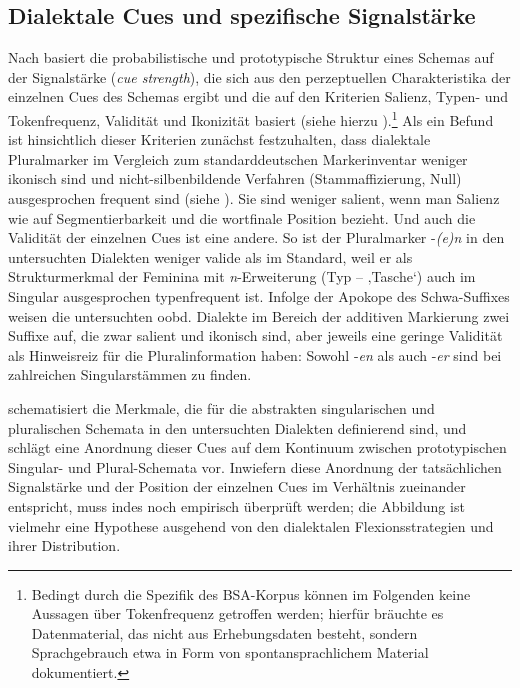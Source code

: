 \subsection{Dialektale Cues und spezifische Signalstärke}
\label{sec:10.3.1}
Nach \citet{Köpcke1988, Köpcke1993} basiert die probabilistische und prototypische Struktur eines Schemas auf der Signalstärke (\textit{cue strength}), die sich aus den perzeptuellen Charakteristika der einzelnen Cues des Schemas ergibt und die auf den Kriterien Salienz, Typen- und Tokenfrequenz, Validität und Ikonizität basiert (siehe hierzu ).\footnote{Bedingt durch die Spezifik des BSA-Korpus können im Folgenden keine Aussagen über Tokenfrequenz getroffen werden; hierfür bräuchte es Datenmaterial, das nicht aus Erhebungsdaten besteht, sondern Sprachgebrauch etwa in Form von spontansprachlichem Material dokumentiert.} Als ein Befund ist hinsichtlich dieser Kriterien zunächst festzuhalten, dass dialektale Pluralmarker im Vergleich zum standarddeutschen Markerinventar weniger ikonisch sind und nicht-silbenbildende Verfahren (Stammaffizierung, Null) ausgesprochen frequent sind (siehe ). Sie sind weniger salient, wenn man Salienz wie \citet[82]{Köpcke1993} auf Segmentierbarkeit und die wortfinale Position bezieht. Und auch die Validität der einzelnen Cues ist eine andere. So ist der Pluralmarker -\textit{(e)n} in den untersuchten Dialekten weniger valide als im Standard, weil er als Strukturmerkmal der Feminina mit \textit{n}{}-Erweiterung (Typ  --  ‚Tasche‘) auch im Singular ausgesprochen typenfrequent ist. Infolge der Apokope des Schwa-Suffixes weisen die untersuchten oobd. Dialekte im Bereich der additiven Markierung zwei Suffixe auf, die zwar salient und ikonisch sind, aber jeweils eine geringe Validität als Hinweisreiz für die Pluralinformation haben: Sowohl -\textit{en} als auch -\textit{er} sind bei zahlreichen Singularstämmen zu finden.

  schematisiert die Merkmale, die für die abstrakten singularischen und pluralischen Schemata in den untersuchten Dialekten definierend sind, und schlägt eine Anordnung dieser Cues auf dem Kontinuum zwischen prototypischen Singular- und Plural-Schemata vor. Inwiefern diese Anordnung der tatsächlichen Signalstärke und der Position der einzelnen Cues im Verhältnis zueinander entspricht, muss indes noch empirisch überprüft werden; die Abbildung ist vielmehr eine Hypothese ausgehend von den dialektalen Flexionsstrategien und ihrer Distribution.


